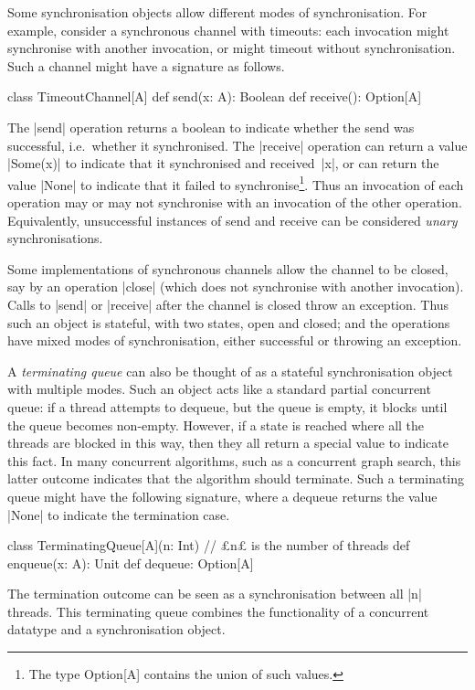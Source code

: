 Some synchronisation objects allow different modes of synchronisation.  For
example, consider a synchronous channel with timeouts: each invocation might
synchronise with another invocation, or might timeout without
synchronisation.  Such a channel might have a signature as follows.
%
\begin{scala}
class TimeoutChannel[A]{
  def send(x: A): Boolean
  def receive(): Option[A]
}
\end{scala}
%
The |send| operation returns a boolean to indicate whether the send was
successful, i.e.~whether it synchronised.  The |receive| operation can return
a value |Some(x)| to indicate that it synchronised and received~|x|, or can
return the value |None| to indicate that it failed to synchronise\footnote{The
  type {\scalashape Option[A]} contains the union of such values.}.  Thus an
invocation of each operation may or may not synchronise with an invocation of
the other operation.  Equivalently, unsuccessful instances of send and receive
can be considered \emph{unary} synchronisations.  

Some implementations of synchronous channels allow the channel to be closed,
say by an operation |close| (which does not synchronise with another
invocation).  Calls to |send| or |receive| after the channel is closed throw
an exception.  Thus such an object is stateful, with two states, open and
closed; and the operations have mixed modes of synchronisation, either
successful or throwing an exception.

A \emph{terminating queue} can also be thought of as a stateful
synchronisation object with multiple modes.  Such an object acts like a
standard partial concurrent queue: if a thread attempts to dequeue, but the
queue is empty, it blocks until the queue becomes non-empty.  However, if a
state is reached where all the threads are blocked in this way, then they all
return a special value to indicate this fact.  In many concurrent algorithms,
such as a concurrent graph search, this latter outcome indicates that the
algorithm should terminate.  Such a terminating queue might have the
following signature, where a dequeue returns the value |None| to indicate the
termination case.
%
\begin{scala}
class TerminatingQueue[A](n: Int){ // £n£ is the number of threads   
  def enqueue(x: A): Unit
  def dequeue: Option[A]
}
\end{scala} 
%
The termination outcome can be seen as a synchronisation between all |n|
threads.  This terminating queue combines the functionality of a
concurrent datatype and a synchronisation object.



